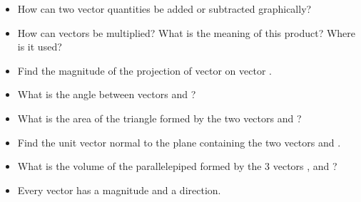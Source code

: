 \begin{ELunit}


\begin{itemize}
\tightlist
\item
  How can two vector quantities be added or subtracted graphically?
\item
  How can vectors be multiplied? What is the meaning of this product? Where is it used?
\end{itemize}


\begin{itemize}
\tightlist
\item
  Find the magnitude of the projection of vector  on vector .
\item
  What is the angle between vectors  and ?
\item
  What is the area of the triangle formed by the two vectors  and ?
\item
  Find the unit vector normal to the plane containing the two vectors  and .
\item
  What is the volume of the parallelepiped formed by the 3 vectors ,  and ?
\end{itemize}

\end{ELunit}

\ELhold


\begin{ELunit}

\begin{itemize}
\tightlist
\item
  Every vector has a magnitude and a direction.
\end{itemize}



\end{ELunit}

